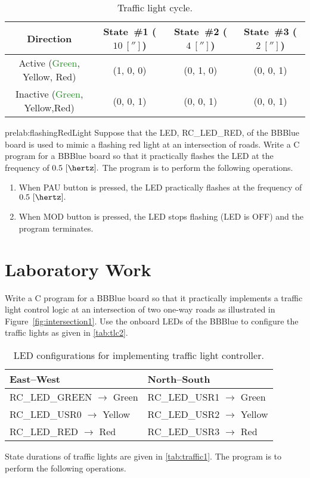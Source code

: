 \begin{table}%
\caption{Traffic light cycle.}
\label{tab:traffic1}
\centering
  \begin{tabular}{c|c|c|c}
  \toprule
  Direction & State~\#1 ($10~[\second]$) & State~\#2 ($4~[\second]$) & State~\#3 ($2~[\second]$)\\
  \toprule
  Active (\textcolor{ForestGreen}{Green}, \textcolor{YellowOrange}{Yellow}, \textcolor{BrickRed}{Red}) & (1, 0, 0) & (0, 1, 0) & (0, 0, 1)\\
  \hline
  Inactive (\textcolor{ForestGreen}{Green}, \textcolor{YellowOrange}{Yellow},\textcolor{BrickRed}{Red}) & (0, 0, 1) & (0, 0, 1) & (0, 0, 1)\\
  \bottomrule
  \end{tabular}
\end{table}


\begin{prelab}{prelab:flashingRedLight}
  Suppose that the LED, RC\_LED\_RED, of the BBBlue board is used  to mimic a flashing red light at an intersection of roads. Write a C program for a BBBlue board so that it practically flashes the LED at the frequency of $0.5~[\hertz].$ The program is to perform the  following operations. %
  \begin{enumerate}
  \item When PAU button is pressed, the LED practically flashes at the frequency of $0.5~[\hertz].$
  \item When MOD button is pressed, the LED stops flashing (LED is OFF) and the program terminates.      
  \end{enumerate}
\end{prelab}




\section{Laboratory Work}

Write a C program for a BBBlue board so that it practically implements a traffic
light control logic  at an intersection of two one-way roads as illustrated in Figure~\ref{fig:intersection1}. Use the
onboard LEDs of the BBBlue to configure the traffic lights as given in
\autoref{tab:tlc2}. %
%
\begin{table}
  \centering
  \caption{LED configurations for implementing traffic light controller. }
  \label{tab:tlc2}  
  \begin{tabular}{l|l}
    \toprule   
    East--West & North--South\\
    \toprule
    RC\_LED\_GREEN $\to$ Green & RC\_LED\_USR1 $\to$ Green\\   	    
    RC\_LED\_USR0 $\to$ Yellow  	  & RC\_LED\_USR2 $\to$ Yellow\\  
    RC\_LED\_RED 	$\to$ Red          & RC\_LED\_USR3 $\to$ Red\\  
    \bottomrule    
  \end{tabular}
\end{table}
%
State durations of traffic lights are given in \autoref{tab:traffic1}. The program is to perform the following operations.



